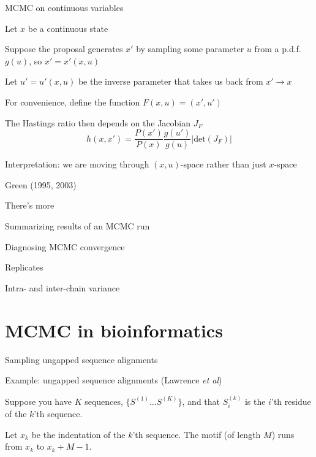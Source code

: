 \documentclass{beamer}
\begin{document}
\begin{frame}{MCMC on continuous variables}

\itemb
\item Let $x$ be a continuous state
\item Suppose the proposal generates $x'$ by sampling some parameter $u$ from a p.d.f. $g(u)$, so $x'=x'(x,u)$
\itemb
 \item Let $u'=u'(x,u)$ be the \alert{inverse} parameter that takes us back from $x' \to x$
 \item For convenience, define the function $F(x,u) = (x',u')$
\iteme
\item The Hastings ratio then depends on the Jacobian $J_F$
\[
h(x,x') = \frac{P(x')}{P(x)} \frac{g(u')}{g(u)} \left| \mbox{det}\left(J_F\right) \right|
\]
\item Interpretation: we are moving through $(x,u)$-space rather than just $x$-space
\item Green (1995, 2003)
\iteme

\end{frame}



\begin{frame}{There's more}

\itemb
\item Summarizing results of an MCMC run
\item Diagnosing MCMC convergence
\itemb
\item Replicates
\item Intra- and inter-chain variance
\iteme
\iteme
\end{frame}


\section{MCMC in bioinformatics}

\begin{frame}{Sampling ungapped sequence alignments}

\itemb
\item Example: ungapped sequence alignments (Lawrence {\em et al})
 \itemb
 \item Suppose you have $K$ sequences, $\{ S^{(1)} \ldots S^{(K)} \}$, and that $S^{(k)}_i$ is the $i$'th residue of the $k$'th sequence.
 \item Let $x_k$ be the indentation of the $k$'th sequence. The motif (of length $M$) runs from $x_k$ to $x_k+M-1$.
 \iteme
\iteme

\end{frame}
\end{document}
